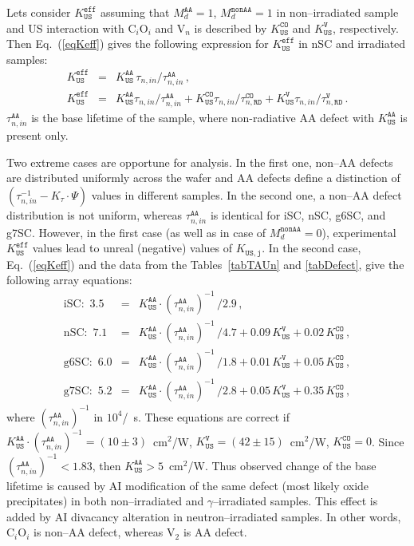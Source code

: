 \documentclass[aip,jap, amsmath,amssymb,reprint]{revtex4-1}
\begin{document}
Lets consider $K_\mathtt{US}^\mathtt{eff}$ assuming that 
$M_d^\mathtt{AA}=1$, $M_d^\mathtt{nonAA}=1$ in non--irradiated sample and
US interaction with C$_i$O$_i$ and V$_n$ is described by $K_\mathtt{US}^\mathtt{CO}$ and $K_\mathtt{US}^\mathtt{V}$, respectively.
Then Eq.~(\ref{eqKeff}) gives the following expression for $K_\mathtt{US}^\mathtt{eff}$ 
in nSC and irradiated samples:
\begin{eqnarray}
K_\mathtt{US}^\mathtt{eff}&=&K_\mathtt{US}^\mathtt{AA}\,\tau_{n,in}/\tau_{n,in}^\mathtt{AA}\,,\nonumber\\
K_\mathtt{US}^\mathtt{eff}&=&K_\mathtt{US}^\mathtt{AA}\tau_{n,in}/\tau_{n,in}^\mathtt{AA}+
                           K_\mathtt{US}^\mathtt{CO}\tau_{n,in}/\tau_{n,\mathtt{RD}}^\mathtt{CO}+
                           K_\mathtt{US}^\mathtt{V}\tau_{n,in}/\tau_{n,\mathtt{RD}}^\mathtt{V} \,.\nonumber
\end{eqnarray}
$\tau_{n,in}^\mathtt{AA}$ is the base lifetime of the sample, where non-radiative AA defect with $K_\mathtt{US}^\mathtt{AA}$ is present only.


Two extreme cases are opportune for analysis.
In the first one, non--AA defects are distributed uniformly across the wafer and
AA defects define a distinction of
$(\tau_{n,in}^{-1}-K_\tau\cdot\Psi)$ values in different samples.
In the second one, a non--AA defect distribution is not uniform,
whereas $\tau_{n,in}^\mathtt{AA}$ is identical for iSC, nSC, g6SC, and g7SC.
However, in the first case (as well as in case of $M_d^\mathtt{nonAA}=0$),
experimental $K_\mathtt{US}^\mathtt{eff}$ values lead to unreal (negative) values of $K_\mathtt{US,j}$.
In the second case, Eq.~(\ref{eqKeff}) and the data from the Tables~\ref{tabTAUn} and \ref{tabDefect}, give the following array equations:
\begin{eqnarray}
\mbox{iSC}:\,\,3.5&=&K_\mathtt{US}^\mathtt{AA}\cdot(\tau_{n,in}^\mathtt{AA})^{-1}\,/2.9\,,\nonumber\\
\mbox{nSC}:\,\,7.1&=&K_\mathtt{US}^\mathtt{AA}\cdot(\tau_{n,in}^\mathtt{AA})^{-1}\,/4.7+0.09\,K_\mathtt{US}^\mathtt{V}+0.02\,K_\mathtt{US}^\mathtt{CO}\,,\nonumber\\
\mbox{g6SC}:\,\,6.0&=&K_\mathtt{US}^\mathtt{AA}\cdot(\tau_{n,in}^\mathtt{AA})^{-1}\,/1.8+0.01\,K_\mathtt{US}^\mathtt{V}+0.05\,K_\mathtt{US}^\mathtt{CO}\,,\nonumber\\
\mbox{g7SC}:\,\,5.2&=&K_\mathtt{US}^\mathtt{AA}\cdot(\tau_{n,in}^\mathtt{AA})^{-1}\,/2.8+0.05\,K_\mathtt{US}^\mathtt{V}+0.35\,K_\mathtt{US}^\mathtt{CO}\,,\nonumber
\end{eqnarray}
where
$(\tau_{n,in}^\mathtt{AA})^{-1}$ in $10^4$/~s.
These equations are correct if
$K_\mathtt{US}^\mathtt{AA}\cdot(\tau_{n,in}^\mathtt{AA})^{-1}=(10\pm3)$~cm$^2$/W,
$K_\mathtt{US}^\mathtt{V}=(42\pm15)$~cm$^2$/W,
$K_\mathtt{US}^\mathtt{CO}=0$.
Since $(\tau_{n,in}^\mathtt{AA})^{-1}<1.83$, then $K_\mathtt{US}^\mathtt{AA}>5$~cm$^2$/W.
Thus observed change of the base lifetime is caused by AI modification of the same defect (most likely oxide precipitates) in
both non--irradiated and $\gamma$--irradiated samples.
This effect is added by AI divacancy alteration in neutron--irradiated samples.
In other words, C$_i$O$_i$ is non--AA defect, whereas V$_2$ is AA defect.
\end{document}
